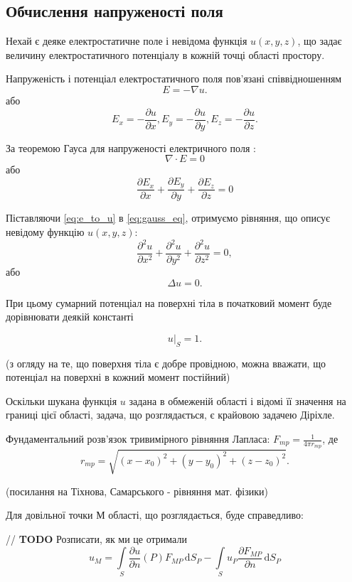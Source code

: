 \documentclass[a4paper,12pt]{article}
\begin{document}
\subsection{Обчислення напруженості поля}

Нехай є деяке електростатичне поле і невідома функція $u(x,y,z)$, що задає величину електростатичного потенціалу в кожній точці області простору.

Напруженість і потенціал електростатичного поля пов’язані співвідношенням
\[
E = -\nabla u.
\]
або
\begin{equation} \label{eq:e_to_u}
E_x = -\frac{\partial u}{\partial x}, E_y = -\frac{\partial u}{\partial y}, E_z = -\frac{\partial u}{\partial z}.
\end{equation}

За теоремою Гауса для напруженості електричного поля \cite{magnet}:
\[
\nabla \cdot E = 0
\]
або
\begin{equation} \label{eq:gauss_eq}
\frac{\partial E_x}{\partial x} + \frac{\partial E_y}{\partial y} + \frac{\partial E_z}{\partial z} = 0
\end{equation}

Піставляючи \ref{eq:e_to_u} в \ref{eq:gauss_eq}, отримуємо рівняння, що описує невідому функцію $u(x,y,z)$:
\[
\frac{\partial ^2 u}{\partial x^2} + \frac{\partial ^2 u}{\partial y^2} + \frac{\partial ^2 u}{\partial z^2} = 0,
\] або
\[
\Delta u = 0.
\]

При цьому сумарний потенціал на поверхні тіла в початковий момент буде дорівнювати деякій константі

\[
\left.u\right|_S = 1.
\]

(з огляду на те, що поверхня тіла є добре провідною, можна вважати, що потенціал на поверхні в кожний момент постійний)


Оскільки шукана функція $u$ задана в обмеженій області і відомі її значення на границі цієї області, задача, що розглядається, є крайовою задачею Діріхле.

Фундаментальний розв’язок тривимірного рівняння Лапласа: $F_{mp} = \frac{1}{4\pi r_{mp}}$, де \[r_{mp} = \sqrt{(x - x_0)^2 + (y - y_0)^2 + (z - z_0)^2}.\]

(посилання на Тіхнова, Самарського - рівняння мат. фізики)

Для довільної точки М області, що розглядається, буде справедливо:

// \textbf{TODO} Розписати, як ми це отримали
\[
u_M = \int\limits_S \frac{\partial u}{\partial n}(P) F_{MP} \, \mathrm{d}S_P - \int\limits_S u_P \frac{\partial F_{MP}}{\partial n} \, \mathrm{d}S_P
\]
\end{document}
